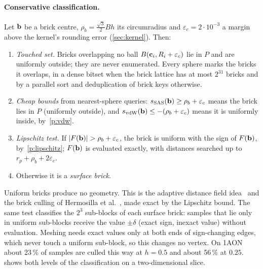 \paragraph{Conservative classification.}
Let $\mathbf{b}$ be a brick centre, $\rho_b = \tfrac{\sqrt3}{2}Bh$ its
circumradius and $\varepsilon_c = 2\cdot10^{-3}$\Ang{} a margin above the
kernel's rounding error (\cref{sec:kernel}). Then:
\begin{enumerate}
  \item \emph{Touched set.} Bricks overlapping no ball
    $B(\mathbf{c}_i, R_i + \varepsilon_c)$ lie in $P$ and are uniformly
    outside; they are never enumerated. Every sphere marks the bricks it
    overlaps, in a dense bitset when the brick lattice has at most $2^{31}$
    bricks and by a parallel sort and deduplication of brick keys
    otherwise.
  \item \emph{Cheap bounds} from nearest-sphere queries:
    $s_{\mathrm{SAS}}(\mathbf{b}) \ge \rho_b + \varepsilon_c$ means the brick
    lies in $P$ (uniformly outside), and
    $s_{\mathrm{vdW}}(\mathbf{b}) \le -(\rho_b + \varepsilon_c)$ means it is
    uniformly inside, by~\ref{p:vdw}.
  \item \emph{Lipschitz test.} If
    $|F(\mathbf{b})| > \rho_b + \varepsilon_c$, the brick is uniform
    with the sign of $F(\mathbf{b})$, by~\ref{p:lipschitz}; $F(\mathbf{b})$ is
    evaluated exactly, with distances searched up to
    $r_p + \rho_b + 2\varepsilon_c$.
  \item Otherwise it is a \emph{surface brick}.
\end{enumerate}
Uniform bricks produce no geometry. This is the adaptive distance field
idea~\cite{frisken2000} and the brick culling of Hermosilla et
al.~\cite{hermosilla2017}, made exact by the Lipschitz bound. The same test
classifies the $2^3$ sub-blocks of each surface brick: samples that lie only
in uniform sub-blocks receive the value $\pm\delta$ (exact sign, inexact
value) without evaluation. Meshing needs exact values only at both ends of
sign-changing edges, which never touch a uniform sub-block, so this changes
no vertex. On 1AON about 23\,\% of samples are culled this way at
$h = 0.5$\Ang{} and about 56\,\% at $0.25$\Ang.  shows
both levels of the classification on a two-dimensional slice.

